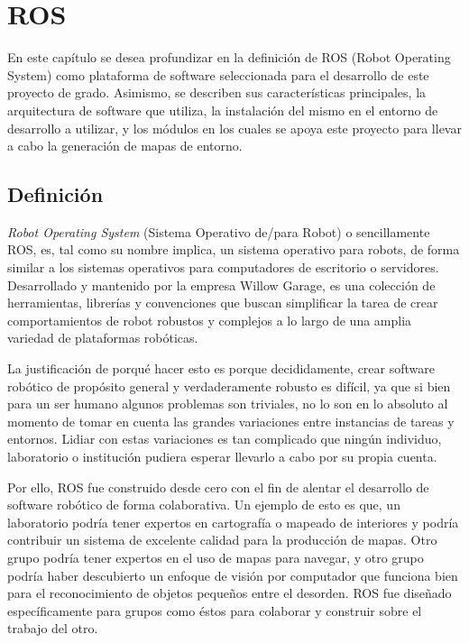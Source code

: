 \chapter{ROS}

En este capítulo se desea profundizar en la definición de ROS (Robot Operating System) como plataforma de software seleccionada para el desarrollo de este proyecto de grado. Asimismo, se describen sus características principales, la arquitectura de software que utiliza, la instalación del mismo en el entorno de desarrollo a utilizar, y los módulos en los cuales se apoya este proyecto para llevar a cabo la generación de mapas de entorno.

\section{Definición}

\textit{Robot Operating System} (Sistema Operativo de/para Robot) o sencillamente ROS, es, tal como su nombre implica, un sistema operativo para robots, de forma similar a los sistemas operativos para computadores de escritorio o servidores. Desarrollado y mantenido por la empresa Willow Garage, es una colección de herramientas, librerías y convenciones que buscan simplificar la tarea de crear comportamientos de robot robustos y complejos a lo largo de una amplia variedad de plataformas robóticas.

La justificación de porqué hacer esto es porque decididamente, crear software robótico de propósito general y verdaderamente robusto es difícil, ya que si bien para un ser humano algunos problemas son triviales, no lo son en lo absoluto al momento de tomar en cuenta las grandes variaciones entre instancias de tareas y entornos. Lidiar con estas variaciones es tan complicado que ningún individuo, laboratorio o institución pudiera esperar llevarlo a cabo por su propia cuenta.

Por ello, ROS fue construido desde cero con el fin de alentar el desarrollo de software robótico de forma colaborativa. Un ejemplo de esto es que, un laboratorio podría tener expertos en cartografía o mapeado de interiores y podría contribuir un sistema de excelente calidad para la producción de mapas. Otro grupo podría tener expertos en el uso de mapas para navegar, y otro grupo podría haber descubierto un enfoque de visión por computador que funciona bien para el reconocimiento de objetos pequeños entre el desorden. ROS fue diseñado específicamente para grupos como éstos para colaborar y construir sobre el trabajo del otro. \cite{aboutros}

